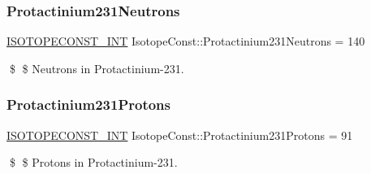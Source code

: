 \subsubsection{\texorpdfstring{Protactinium231\+Neutrons}{Protactinium231Neutrons}}
{\footnotesize\ttfamily \mbox{\hyperlink{group___isotope_const-_macros_ga5f18360b3e99483a35c32d789e62621c}{I\+S\+O\+T\+O\+P\+E\+C\+O\+N\+S\+T\+\_\+\+I\+NT}} Isotope\+Const\+::\+Protactinium231\+Neutrons = 140}

\$ \$ Neutrons in Protactinium-\/231. \mbox{\label{group___isotope_const-_protactinium-_pa231_ga5b456aac7077c68a27a4b35870ded584}} 
\subsubsection{\texorpdfstring{Protactinium231\+Protons}{Protactinium231Protons}}
{\footnotesize\ttfamily \mbox{\hyperlink{group___isotope_const-_macros_ga5f18360b3e99483a35c32d789e62621c}{I\+S\+O\+T\+O\+P\+E\+C\+O\+N\+S\+T\+\_\+\+I\+NT}} Isotope\+Const\+::\+Protactinium231\+Protons = 91}

\$ \$ Protons in Protactinium-\/231. 